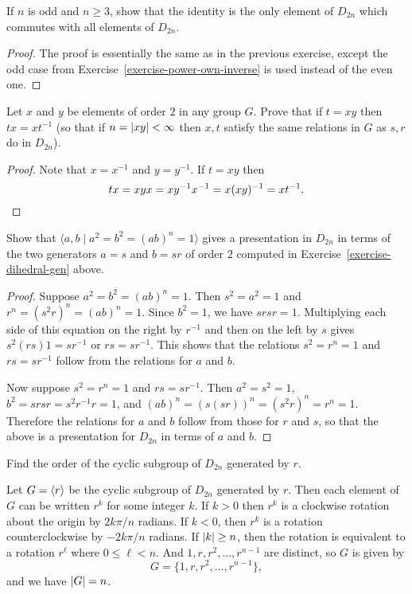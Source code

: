  If $n$ is odd and $n\geq3$, show that the identity is the
only element of $D_{2n}$ which commutes with all elements of $D_{2n}$.
\begin{proof}
  The proof is essentially the same as in the previous exercise,
  except the odd case from Exercise~\ref{exercise-power-own-inverse}
  is used instead of the even one.
\end{proof}

 Let $x$ and $y$ be elements of order $2$ in any group
$G$. Prove that if $t = xy$ then $tx = xt^{-1}$ (so that if
$n = \lvert{xy}\rvert < \infty$ then $x, t$ satisfy the same relations in $G$
as $s,r$ do in $D_{2n}$).
\label{exercise-x-y-order-2-satisfy-dihedral-relations}
\begin{proof}
  Note that $x = x^{-1}$ and $y = y^{-1}$. If $t = xy$ then
  \begin{equation*}
    tx = xyx = xy^{-1}x^{-1} = x(xy)^{-1} = xt^{-1}. \qedhere
  \end{equation*}
\end{proof}

 Show that $\langle a,b\mid a^2 = b^2 = (ab)^n = 1\rangle$
gives a presentation in $D_{2n}$ in terms of the two generators
$a = s$ and $b = sr$ of order $2$ computed in
Exercise~\ref{exercise-dihedral-gen} above.
\begin{proof}
  Suppose $a^2 = b^2 = (ab)^n = 1$. Then $s^2 = a^2 = 1$ and
  $r^n = (s^2r)^n = (ab)^n = 1$. Since $b^2 = 1$, we have $srsr =
  1$. Multiplying each side of this equation on the right by $r^{-1}$
  and then on the left by $s$ gives $s^2(rs)1 = sr^{-1}$ or
  $rs = sr^{-1}$. This shows that the relations $s^2 = r^n = 1$ and
  $rs = sr^{-1}$ follow from the relations for $a$ and $b$.

  Now suppose $s^2 = r^n = 1$ and $rs = sr^{-1}$. Then
  $a^2 = s^2 = 1$, $b^2 = srsr = s^2r^{-1}r = 1$, and
  $(ab)^n = (s(sr))^n = (s^2r)^n = r^n = 1$. Therefore the relations
  for $a$ and $b$ follow from those for $r$ and $s$, so that the above
  is a presentation for $D_{2n}$ in terms of $a$ and $b$.
\end{proof}

 Find the order of the cyclic subgroup of $D_{2n}$ generated
by $r$.
\begin{solution}
  Let $G = \langle{r}\rangle$ be the cyclic subgroup of $D_{2n}$ generated by
  $r$. Then each element of $G$ can be written $r^k$ for some integer
  $k$. If $k>0$ then $r^k$ is a clockwise rotation about the origin by
  $2k\pi/n$ radians. If $k<0$, then $r^k$ is a rotation
  counterclockwise by $-2k\pi/n$ radians. If $\lvert{k}\rvert\geq n$, then the
  rotation is equivalent to a rotation $r^\ell$ where
  $0\leq\ell<n$. And $1, r, r^2, \dots, r^{n-1}$ are distinct, so $G$
  is given by
  \begin{equation*}
    G = \{ 1, r, r^2, \dots, r^{n-1} \},
  \end{equation*}
  and we have $\lvert{G}\rvert = n$.
\end{solution}

